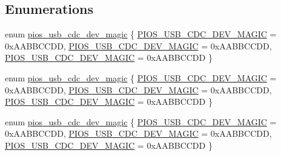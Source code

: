 \subsection*{\-Enumerations}
\begin{DoxyCompactItemize}
\item 
enum \hyperlink{group___p_i_o_s___u_s_b___c_o_m_gab4c476b0e464c59dcf6eadec015a87b8}{pios\-\_\-usb\-\_\-cdc\-\_\-dev\-\_\-magic} \{ \hyperlink{group___p_i_o_s___u_s_b___c_o_m_ggab4c476b0e464c59dcf6eadec015a87b8a41f1698bd0d94e1a4755f2a39d3ce022}{\-P\-I\-O\-S\-\_\-\-U\-S\-B\-\_\-\-C\-D\-C\-\_\-\-D\-E\-V\-\_\-\-M\-A\-G\-I\-C} =  0x\-A\-A\-B\-B\-C\-C\-D\-D, 
\hyperlink{group___p_i_o_s___u_s_b___c_o_m_ggab4c476b0e464c59dcf6eadec015a87b8a41f1698bd0d94e1a4755f2a39d3ce022}{\-P\-I\-O\-S\-\_\-\-U\-S\-B\-\_\-\-C\-D\-C\-\_\-\-D\-E\-V\-\_\-\-M\-A\-G\-I\-C} =  0x\-A\-A\-B\-B\-C\-C\-D\-D, 
\hyperlink{group___p_i_o_s___u_s_b___c_o_m_ggab4c476b0e464c59dcf6eadec015a87b8a41f1698bd0d94e1a4755f2a39d3ce022}{\-P\-I\-O\-S\-\_\-\-U\-S\-B\-\_\-\-C\-D\-C\-\_\-\-D\-E\-V\-\_\-\-M\-A\-G\-I\-C} =  0x\-A\-A\-B\-B\-C\-C\-D\-D
 \}
\item 
enum \hyperlink{group___p_i_o_s___u_s_b___c_o_m_gab4c476b0e464c59dcf6eadec015a87b8}{pios\-\_\-usb\-\_\-cdc\-\_\-dev\-\_\-magic} \{ \hyperlink{group___p_i_o_s___u_s_b___c_o_m_ggab4c476b0e464c59dcf6eadec015a87b8a41f1698bd0d94e1a4755f2a39d3ce022}{\-P\-I\-O\-S\-\_\-\-U\-S\-B\-\_\-\-C\-D\-C\-\_\-\-D\-E\-V\-\_\-\-M\-A\-G\-I\-C} =  0x\-A\-A\-B\-B\-C\-C\-D\-D, 
\hyperlink{group___p_i_o_s___u_s_b___c_o_m_ggab4c476b0e464c59dcf6eadec015a87b8a41f1698bd0d94e1a4755f2a39d3ce022}{\-P\-I\-O\-S\-\_\-\-U\-S\-B\-\_\-\-C\-D\-C\-\_\-\-D\-E\-V\-\_\-\-M\-A\-G\-I\-C} =  0x\-A\-A\-B\-B\-C\-C\-D\-D, 
\hyperlink{group___p_i_o_s___u_s_b___c_o_m_ggab4c476b0e464c59dcf6eadec015a87b8a41f1698bd0d94e1a4755f2a39d3ce022}{\-P\-I\-O\-S\-\_\-\-U\-S\-B\-\_\-\-C\-D\-C\-\_\-\-D\-E\-V\-\_\-\-M\-A\-G\-I\-C} =  0x\-A\-A\-B\-B\-C\-C\-D\-D
 \}
\item 
enum \hyperlink{group___p_i_o_s___u_s_b___c_o_m_gab4c476b0e464c59dcf6eadec015a87b8}{pios\-\_\-usb\-\_\-cdc\-\_\-dev\-\_\-magic} \{ \hyperlink{group___p_i_o_s___u_s_b___c_o_m_ggab4c476b0e464c59dcf6eadec015a87b8a41f1698bd0d94e1a4755f2a39d3ce022}{\-P\-I\-O\-S\-\_\-\-U\-S\-B\-\_\-\-C\-D\-C\-\_\-\-D\-E\-V\-\_\-\-M\-A\-G\-I\-C} =  0x\-A\-A\-B\-B\-C\-C\-D\-D, 
\hyperlink{group___p_i_o_s___u_s_b___c_o_m_ggab4c476b0e464c59dcf6eadec015a87b8a41f1698bd0d94e1a4755f2a39d3ce022}{\-P\-I\-O\-S\-\_\-\-U\-S\-B\-\_\-\-C\-D\-C\-\_\-\-D\-E\-V\-\_\-\-M\-A\-G\-I\-C} =  0x\-A\-A\-B\-B\-C\-C\-D\-D, 
\hyperlink{group___p_i_o_s___u_s_b___c_o_m_ggab4c476b0e464c59dcf6eadec015a87b8a41f1698bd0d94e1a4755f2a39d3ce022}{\-P\-I\-O\-S\-\_\-\-U\-S\-B\-\_\-\-C\-D\-C\-\_\-\-D\-E\-V\-\_\-\-M\-A\-G\-I\-C} =  0x\-A\-A\-B\-B\-C\-C\-D\-D
 \}
\end{DoxyCompactItemize}

